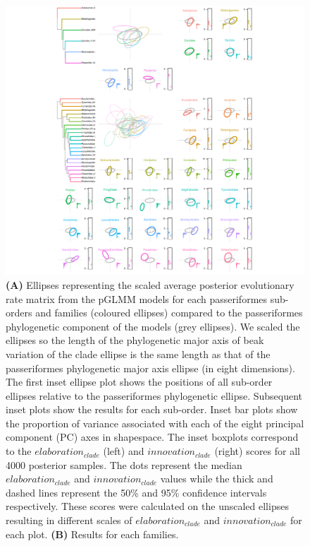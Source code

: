\documentclass[12pt,a4paper]{article}
\begin{document}
\begin{figure}[H]
\centering
   \includegraphics[width=1\textwidth]{Figures/ellipses_passeriformes.pdf}
\caption{\textbf{(A)} Ellipses representing the scaled average posterior evolutionary rate matrix from the pGLMM models for each passeriformes sub-orders and families (coloured ellipses) compared to the passeriformes phylogenetic component of the models (grey ellipses).
We scaled the ellipses so the length of the phylogenetic major axis of beak variation of the clade ellipse is the same length as that of the passeriformes phylogenetic major axis ellipse (in eight dimensions).
The first inset ellipse plot shows the positions of all sub-order ellipses relative to the passeriformes phylogenetic ellipse.
Subsequent inset plots show the results for each sub-order. 
Inset bar plots show the proportion of variance associated with each of the eight principal component (PC) axes in shapespace.
The inset boxplots correspond to the $elaboration_{clade}$ (left) and $innovation_{clade}$ (right) scores for all 4000 posterior samples.
The dots represent the median $elaboration_{clade}$ and $innovation_{clade}$ values while the thick and dashed lines represent the 50\% and 95\% confidence intervals respectively.
These scores were calculated on the unscaled ellipses resulting in different scales of $elaboration_{clade}$ and $innovation_{clade}$ for each plot.
\textbf{(B)} Results for each families.}
\label{fig_ellipses_passeriformes}
\end{figure}
\end{document}
